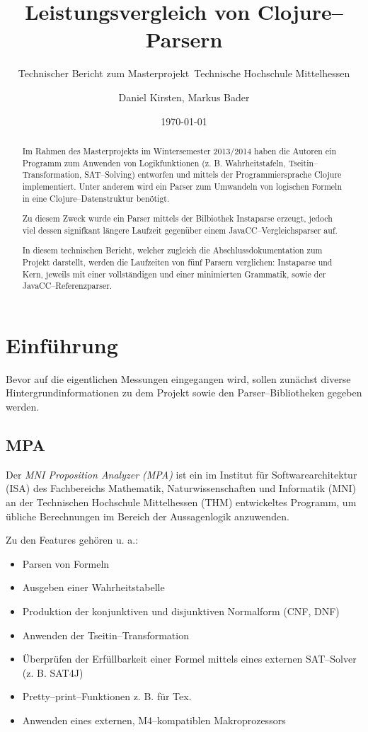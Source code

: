 \documentclass[ngerman,a4paper,abstracton,open=right,twoside=false,toc=listofnumbered,bibtotocnumbered]{scrreprt}
\title{Leistungsvergleich von Clojure--Parsern}
\subtitle{Technischer Bericht zum Masterprojekt\
Technische Hochschule Mittelhessen}
\author{Daniel Kirsten, Markus Bader}
\date{\today}
\begin{document}
\maketitle
\newpage
\begin{abstract}

Im Rahmen des Masterprojekts im Wintersemester 2013/2014 haben die Autoren ein Programm zum Anwenden von Logikfunktionen (z. B. Wahrheitstafeln, Tseitin--Transformation, SAT--Solving) entworfen und mittels der Programmiersprache Clojure implementiert. Unter anderem wird ein Parser zum Umwandeln von logischen Formeln in eine Clojure--Datenstruktur benötigt.

Zu diesem Zweck wurde ein Parser mittels der Bilbiothek Instaparse erzeugt, jedoch viel dessen signifkant längere Laufzeit gegenüber einem JavaCC--Vergleichsparser auf.

In diesem technischen Bericht, welcher zugleich die Abschlussdokumentation zum Projekt darstellt, werden die Laufzeiten von fünf Parsern verglichen: Instaparse und Kern, jeweils mit einer vollständigen und einer minimierten Grammatik, sowie der JavaCC--Referenzparser.

\end{abstract}
\newpage
\tableofcontents
\newpage

\chapter{Einführung}

Bevor auf die eigentlichen Messungen eingegangen wird, sollen zunächst diverse Hintergrundinformationen zu dem Projekt sowie den Parser--Bibliotheken gegeben werden.

\section{MPA}

Der \emph{MNI Proposition Analyzer (MPA)} ist ein im Institut für Softwarearchitektur (ISA) des Fachbereichs Mathematik, Naturwissenschaften und Informatik (MNI) an der Technischen Hochschule Mittelhessen (THM) entwickeltes Programm, um übliche Berechnungen im Bereich der Aussagenlogik anzuwenden. \cite{mpa}

Zu den Features gehören u. a.:

\begin{itemize}
	\item Parsen von Formeln
	\item Ausgeben einer Wahrheitstabelle
	\item Produktion der konjunktiven und disjunktiven Normalform (CNF, DNF)
	\item Anwenden der Tseitin--Transformation
	\item Überprüfen der Erfüllbarkeit einer Formel mittels eines externen SAT--Solver (z. B. SAT4J)
	\item Pretty--print--Funktionen z. B. für Tex.
	\item Anwenden eines externen, M4--kompatiblen Makroprozessors
\end{itemize}
\end{document}
